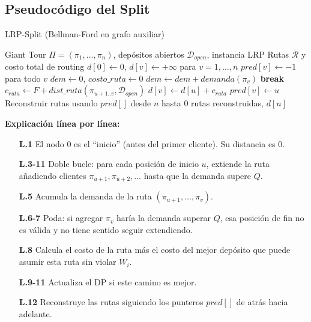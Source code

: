 \documentclass[12pt,a4paper]{article}
\begin{document}
\subsection{Pseudocódigo del Split}

\begin{algorithm}[H]
\caption{LRP-Split (Bellman-Ford en grafo auxiliar)}
\label{alg:split}
\begin{algorithmic}[1]
\Require Giant Tour $\Pi = (\pi_1, \ldots, \pi_n)$, depósitos abiertos $\mathcal{D}_{open}$, instancia LRP
\Ensure Rutas $\mathcal{R}$ y costo total de routing
\State $d[0] \gets 0$, $d[v] \gets +\infty$ para $v = 1, \ldots, n$  
\State $pred[v] \gets -1$ para todo $v$
    \State $dem \gets 0$, $costo\_ruta \gets 0$
                                  
        \State $dem \gets dem + demanda(\pi_v)$
         \textbf{break} \EndIf                         {}
        \State $c_{ruta} \gets F + dist\_ruta(\pi_{u+1..v}, \mathcal{D}_{open})$ 
            \State $d[v] \gets d[u] + c_{ruta}$
            \State $pred[v] \gets u$                                  
        \EndIf
    \EndFor
\EndFor
\State Reconstruir rutas usando $pred[]$ desde $n$ hasta $0$
\State \Return rutas reconstruidas, $d[n]$
\end{algorithmic}
\end{algorithm}

\textbf{Explicación línea por línea:}
\begin{itemize}[leftmargin=2cm]
\item[\textbf{L.1}] El nodo 0 es el ``inicio'' (antes del primer cliente). Su distancia es 0.
\item[\textbf{L.3-11}] Doble bucle: para cada posición de inicio $u$, extiende la ruta añadiendo clientes $\pi_{u+1}, \pi_{u+2}, \ldots$ hasta que la demanda supere $Q$.
\item[\textbf{L.5}] Acumula la demanda de la ruta $(\pi_{u+1}, \ldots, \pi_v)$.
\item[\textbf{L.6-7}] Poda: si agregar $\pi_v$ haría la demanda superar $Q$, esa posición de fin no es válida y no tiene sentido seguir extendiendo.
\item[\textbf{L.8}] Calcula el costo de la ruta más el costo del mejor depósito que puede asumir esta ruta sin violar $W_i$.
\item[\textbf{L.9-11}] Actualiza el DP si este camino es mejor.
\item[\textbf{L.12}] Reconstruye las rutas siguiendo los punteros $pred[]$ de atrás hacia adelante.
\end{itemize}
\end{document}
